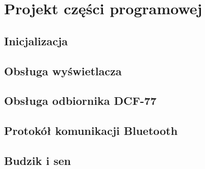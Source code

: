 \chapter{Projekt części programowej}

\section{Inicjalizacja}

\section{Obsługa wyświetlacza}

\section{Obsługa odbiornika DCF-77}

\section{Protokół komunikacji Bluetooth}

\section{Budzik i sen}
